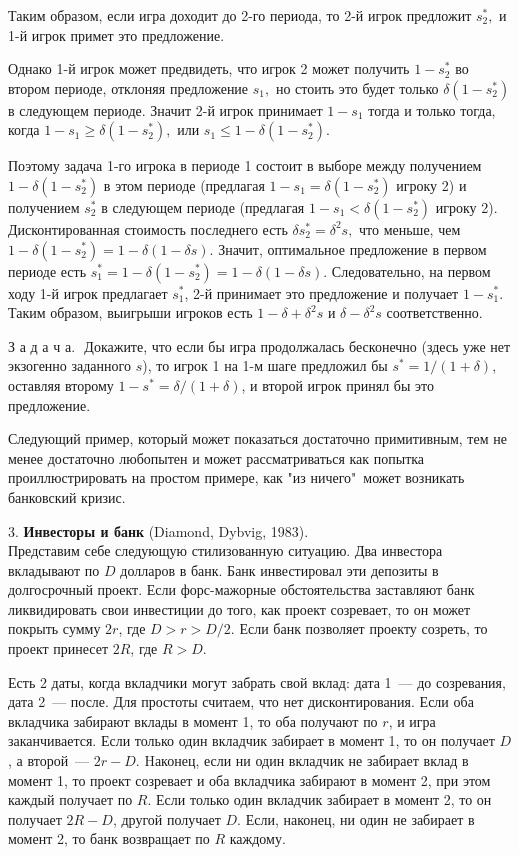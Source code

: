Таким образом, если игра доходит до 2-го периода, то 2-й игрок
предложит $s^*_2,$ и 1-й игрок примет это предложение.

Однако 1-й игрок может предвидеть, что игрок 2 может получить
$1-s^*_2$ во втором периоде,  отклоняя предложение $s_1,$ но
стоить это будет только $\delta(1-s^*_2)$ в следующем периоде. Значит 2-й
игрок принимает $1-s_1$ тогда и только тогда, когда
$1-s_1\ge\delta(1-s^*_2),$ или $s_1\le 1-\delta(1-s^*_2)$.

Поэтому задача 1-го игрока в периоде 1 состоит в выборе между
получением $1-\delta(1-s^*_2)$ в этом периоде (предлагая
$1-s_1=\delta(1-s^*_2)$ игроку 2) и получением $s^*_2$ в следующем
периоде (предлагая $1-s_1<\delta(1-s^*_2)$ игроку 2).
Дисконтированная стоимость последнего есть $\delta s^*_2=\delta^2 s,$
что меньше, чем $1-\delta(1-s^*_2)=1-\delta(1-\delta s).$ Значит,
оптимальное предложение в первом периоде есть
$s^*_1=1-\delta(1-s^*_2)=1-\delta(1-\delta s).$ Следовательно, на
первом ходу 1-й игрок предлагает $s^*_1$, 2-й принимает это
предложение и получает $1-s^*_1.$  Таким образом, выигрыши игроков
есть $1-\delta+\delta^2s$ и $\delta-\delta^2s$ соответственно.

З а д а ч а.\,\, Докажите, что если бы игра продолжалась бесконечно
(здесь уже нет экзогенно заданного $s$), то игрок 1 на 1-м шаге
предложил бы $s^*=1/(1+\delta)$, оставляя второму
$1-s^*=\delta/(1+\delta)$, и второй игрок принял бы это предложение.
\smallskip

\noindent

Следующий пример, который может показаться достаточно примитивным, тем не менее
достаточно любопытен и может рассматриваться как попытка
проиллюстрировать на простом примере, как "из ничего"\, может возникать банковский кризис.

3. {\bf Инвесторы и банк} (Diamond, Dybvig, 1983).\\
Представим себе следующую стилизованную ситуацию. Два инвестора вкладывают
по $D$  долларов в банк. Банк инвестировал эти депозиты в долгосрочный проект. Если
форс-мажорные обстоятельства заставляют банк
ликвидировать свои инвестиции до того, как проект
созревает, то он может покрыть сумму $2r$, где $D>r>D/2$.
Если банк позволяет проекту созреть, то проект принесет
$2R$, где $R>D$.

Есть 2 даты, когда вкладчики могут забрать свой вклад: дата 1~--- до
созревания, дата 2~--- после. Для простоты считаем, что нет
дисконтирования. Если оба вкладчика забирают вклады в момент 1, то
оба получают по $r$, и игра заканчивается. Если только один вкладчик
забирает в момент 1, то он получает $D$, а второй~--- $2r-D$. Hаконец,
если ни один вкладчик не забирает вклад в момент 1, то проект созревает и
оба вкладчика забирают в момент 2, при этом каждый получает по $R$.
Если только один вкладчик забирает в момент 2, то он получает $2R-D$,
другой получает $D$. Если, наконец, ни один не забирает в момент 2,
то банк возвращает по $R$ каждому.


